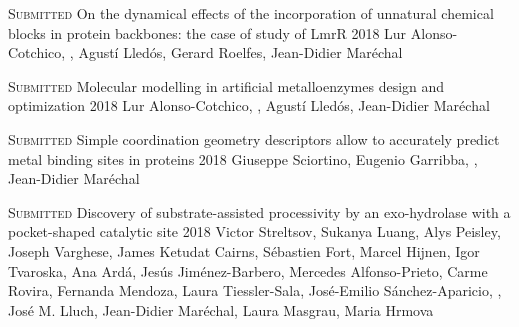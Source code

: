 

\hspace*{\fill}\bodyfontlight\footnotesize{}

\begin{cventries}

  \pubentry
    {\scshape{Submitted}} %
    {On the dynamical effects of the incorporation of unnatural chemical blocks in protein backbones: the case of study of LmrR} %
    {2018} %
    {} %
    {Lur Alonso-Cotchico, , Agustí Lledós, Gerard Roelfes, Jean-Didier Maréchal} %
    {} %
    {} %

  \pubentry
    {\scshape{Submitted}} %
    {Molecular modelling in artificial metalloenzymes design and optimization} %
    {2018} %
    {} %
    {Lur Alonso-Cotchico, , Agustí Lledós, Jean-Didier Maréchal} %
    {} %
    {} %

  \pubentry
    {\scshape{Submitted}} %
    {Simple coordination geometry descriptors allow to accurately predict metal binding sites in proteins} %
    {2018} %
    {} %
    {Giuseppe Sciortino, Eugenio Garribba, ,\textsuperscript{\dagger} Jean-Didier Maréchal\textsuperscript{\dagger}} %
    {} %
    {} %

  \pubentry
    {\scshape{Submitted}} %
    {Discovery of substrate-assisted processivity by an exo-hydrolase with a pocket-shaped catalytic site} %
    {2018} %
    {} %
    {Victor Streltsov, Sukanya Luang, Alys Peisley, Joseph Varghese, James Ketudat Cairns, Sébastien Fort, Marcel Hijnen, Igor Tvaroska, Ana Ardá, Jesús Jiménez-Barbero, Mercedes Alfonso-Prieto, Carme Rovira, Fernanda Mendoza, Laura Tiessler-Sala, José-Emilio Sánchez-Aparicio, , José M. Lluch, Jean-Didier Maréchal, Laura Masgrau, Maria Hrmova} %
    {} %
    {} %


\end{cventries}

